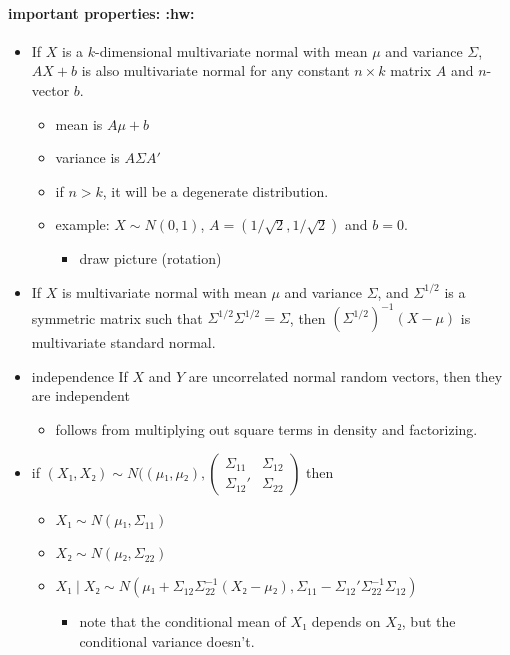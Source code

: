 \paragraph{important properties: \textbf{:hw:}}
\begin{itemize}
\item If $X$ is a $k$-dimensional multivariate normal with mean $μ$
  and variance $Σ$, $A X + b$ is also multivariate normal for any
  constant $n × k$ matrix $A$ and $n$-vector $b$.
\begin{itemize}
\item mean is $A μ + b$
\item variance is $A Σ A'$
\item if $n > k$, it will be a degenerate distribution.
\item example: $X ∼ N(0,1)$, $A = (1/\sqrt{2}, 1/\sqrt{2})$ and $b = 0$.
\begin{itemize}
\item draw picture (rotation)
\end{itemize}
\end{itemize}
\item If $X$ is multivariate normal with mean $μ$ and variance $Σ$,
  and $Σ^{1/2}$ is a symmetric matrix such that $Σ^{1/2} Σ^{1/2} = Σ$,
  then $(Σ^{1/2})^{-1} (X - μ)$ is multivariate standard normal.
\item independence
        If $X$ and $Y$ are uncorrelated normal random vectors, then they
        are independent
\begin{itemize}
\item follows from multiplying out square terms in density and
          factorizing.
\end{itemize}
\item if $(X₁,X₂) ∼ N((μ₁,μ₂), \begin{pmatrix} Σ_{11} & Σ_{12} \\ Σ_{12}' & Σ_{22} \end{pmatrix}$ then
\begin{itemize}
\item $X₁ ∼ N(μ₁, Σ_{11})$
\item $X₂ ∼ N(μ₂, Σ_{22})$
\item $X₁ ∣ X₂ ∼ N(μ₁ + Σ_{12} Σ_{22}^{-1} (X₂ - μ₂), Σ_{11} - Σ_{12}'Σ_{22}^{-1} Σ_{12})$
\begin{itemize}
\item note that the conditional mean of $X₁$ depends on $X₂$, but the conditional variance doesn't.
\end{itemize}
\end{itemize}

\end{itemize}
